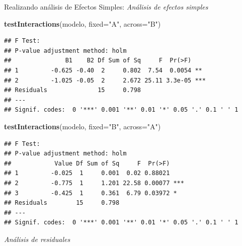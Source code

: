 \documentclass[]{book}
\newenvironment{Shaded}{\begin{snugshade}}{\end{snugshade}}
\newcommand{\KeywordTok}[1]{\textcolor[rgb]{0.13,0.29,0.53}{\textbf{#1}}}
\newcommand{\DataTypeTok}[1]{\textcolor[rgb]{0.13,0.29,0.53}{#1}}
\newcommand{\DecValTok}[1]{\textcolor[rgb]{0.00,0.00,0.81}{#1}}
\newcommand{\StringTok}[1]{\textcolor[rgb]{0.31,0.60,0.02}{#1}}
\newcommand{\OtherTok}[1]{\textcolor[rgb]{0.56,0.35,0.01}{#1}}
\newcommand{\OperatorTok}[1]{\textcolor[rgb]{0.81,0.36,0.00}{\textbf{#1}}}
\newcommand{\NormalTok}[1]{#1}
\begin{document}
Realizando análisis de Efectos Simples: \emph{Análisis de efectos
simples}

\begin{Shaded}
\begin{Highlighting}[]
\KeywordTok{testInteractions}\NormalTok{(modelo, }\DataTypeTok{fixed=}\StringTok{"A"}\NormalTok{, }\DataTypeTok{across=}\StringTok{"B"}\NormalTok{)}
\end{Highlighting}
\end{Shaded}

\begin{verbatim}
## F Test: 
## P-value adjustment method: holm
##               B1    B2 Df Sum of Sq     F  Pr(>F)    
## 1         -0.625 -0.40  2     0.802  7.54  0.0054 ** 
## 2         -1.025 -0.05  2     2.672 25.11 3.3e-05 ***
## Residuals              15     0.798                  
## ---
## Signif. codes:  0 '***' 0.001 '**' 0.01 '*' 0.05 '.' 0.1 ' ' 1
\end{verbatim}

\begin{Shaded}
\begin{Highlighting}[]
\KeywordTok{testInteractions}\NormalTok{(modelo, }\DataTypeTok{fixed=}\StringTok{"B"}\NormalTok{, }\DataTypeTok{across=}\StringTok{"A"}\NormalTok{)}
\end{Highlighting}
\end{Shaded}

\begin{verbatim}
## F Test: 
## P-value adjustment method: holm
##            Value Df Sum of Sq     F  Pr(>F)    
## 1         -0.025  1     0.001  0.02 0.88021    
## 2         -0.775  1     1.201 22.58 0.00077 ***
## 3         -0.425  1     0.361  6.79 0.03972 *  
## Residuals        15     0.798                  
## ---
## Signif. codes:  0 '***' 0.001 '**' 0.01 '*' 0.05 '.' 0.1 ' ' 1
\end{verbatim}

\emph{Análisis de residuales}

\begin{Shaded}
\end{Shaded}
\end{document}

